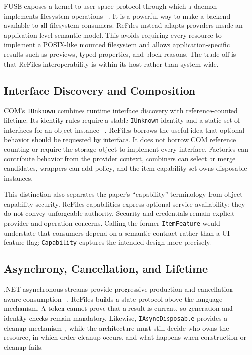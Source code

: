 \documentclass[10pt,a4paper,twoside]{article}
\begin{document}
FUSE exposes a kernel-to-user-space protocol through which a daemon implements filesystem operations
~\cite{linux-fuse}. It is a powerful way to make a backend available to all filesystem consumers. ReFiles instead
adapts providers inside an application-level semantic model. This avoids requiring every resource to implement a
POSIX-like mounted filesystem and allows application-specific results such as previews, typed properties, and
block reasons. The trade-off is that ReFiles interoperability is within its host rather than system-wide.

\subsection{Interface Discovery and Composition}

COM's \texttt{IUnknown} combines runtime interface discovery with reference-counted lifetime. Its identity rules
require a stable \texttt{IUnknown} identity and a static set of interfaces for an object instance
~\cite{com-query-interface}. ReFiles borrows the useful idea that optional behavior should be requested by
interface. It does not borrow COM reference counting or require the storage object to implement every interface.
Factories can contribute behavior from the provider context, combiners can select or merge candidates, wrappers
can add policy, and the item capability set owns disposable instances.

This distinction also separates the paper's ``capability'' terminology from object-capability security. ReFiles
capabilities express optional service availability; they do not convey unforgeable authority. Security and
credentials remain explicit provider and operation concerns. Calling the former \texttt{ItemFeature} would
understate that consumers depend on a semantic contract rather than a UI feature flag; \texttt{Capability}
captures the intended design more precisely.

\subsection{Asynchrony, Cancellation, and Lifetime}

.NET asynchronous streams provide progressive production and cancellation-aware consumption
~\cite{dotnet-async-streams}. ReFiles builds a state protocol above the language mechanism. A token cannot prove
that a result is current, so generation and identity checks remain mandatory. Likewise, \texttt{IAsyncDisposable}
provides a cleanup mechanism~\cite{dotnet-async-dispose}, while the architecture must still decide who owns the
resource, in which order cleanup occurs, and what happens when construction or cleanup fails.
\end{document}

